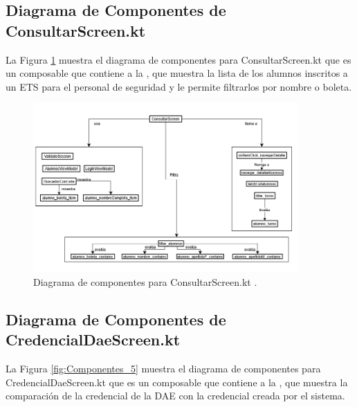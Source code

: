 \newpage

\subsection{Diagrama de Componentes de ConsultarScreen.kt}

La Figura \ref{fig:Componentes_4} muestra el diagrama de componentes para ConsultarScreen.kt que es un composable que contiene a la , que muestra la lista de los alumnos inscritos a un ETS para el personal de seguridad y le permite filtrarlos por nombre o boleta.

\begin{figure}[htbp!]
	\begin{center}
		\includegraphics[width=0.9\textwidth]{DiagramasMoviles/DCM (16)}
		\caption{Diagrama de componentes para ConsultarScreen.kt .}
		\label{fig:Componentes_4}
	\end{center}
\end{figure}

\newpage

\subsection{Diagrama de Componentes de CredencialDaeScreen.kt}

La Figura \ref{fig:Componentes_5} muestra el diagrama de componentes para CredencialDaeScreen.kt que es un composable que contiene a la , que muestra la comparación de la credencial de la DAE con la credencial creada por el sistema.

